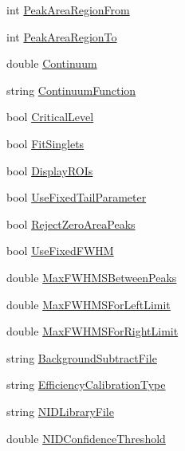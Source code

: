 \begin{DoxyCompactItemize}
\item 
int \hyperlink{class_scintilab_1_1_job_params_af2d6aea23fbd17166ef2699b07cc1197}{Peak\+Area\+Region\+From}
\item 
int \hyperlink{class_scintilab_1_1_job_params_a6e41425ec29431a5d1eaaace63b12582}{Peak\+Area\+Region\+To}
\item 
double \hyperlink{class_scintilab_1_1_job_params_ab3354168d42a8f5c23e465efa4c9bde5}{Continuum}
\item 
string \hyperlink{class_scintilab_1_1_job_params_a6560dfa91d1c2aee8308604a8d932ee3}{Continuum\+Function}
\item 
bool \hyperlink{class_scintilab_1_1_job_params_ac831d3241123c1bf2230d1e4c19f4c79}{Critical\+Level}
\item 
bool \hyperlink{class_scintilab_1_1_job_params_a771a3ff1807c3d1ce296e5a0f866b40b}{Fit\+Singlets}
\item 
bool \hyperlink{class_scintilab_1_1_job_params_a6db9db51477c56293619f73e0355d1da}{Display\+R\+O\+Is}
\item 
bool \hyperlink{class_scintilab_1_1_job_params_a6c217fb07858b573416969adccff67fe}{Use\+Fixed\+Tail\+Parameter}
\item 
bool \hyperlink{class_scintilab_1_1_job_params_aa6cf431fa112d6414c1d8ec0128a1272}{Reject\+Zero\+Area\+Peaks}
\item 
bool \hyperlink{class_scintilab_1_1_job_params_a8b87658f7291b548c701523311412220}{Use\+Fixed\+F\+W\+H\+M}
\item 
double \hyperlink{class_scintilab_1_1_job_params_a947ec9aa050ad8c2ac496071bfb18aa7}{Max\+F\+W\+H\+M\+S\+Between\+Peaks}
\item 
double \hyperlink{class_scintilab_1_1_job_params_adf3e9f8affd2eafb0372f78a22c0f96e}{Max\+F\+W\+H\+M\+S\+For\+Left\+Limit}
\item 
double \hyperlink{class_scintilab_1_1_job_params_a5d802288df6d97edde4ea8841a70d16b}{Max\+F\+W\+H\+M\+S\+For\+Right\+Limit}
\item 
string \hyperlink{class_scintilab_1_1_job_params_a2cc234f12fe0c4b2b9fceaabf038e1b6}{Background\+Subtract\+File}
\item 
string \hyperlink{class_scintilab_1_1_job_params_a45269d4387cc3e0a5bff447ae1e2d5e8}{Efficiency\+Calibration\+Type}
\item 
string \hyperlink{class_scintilab_1_1_job_params_a3b26558c0d462457fd091cd109ff2972}{N\+I\+D\+Library\+File}
\item 
double \hyperlink{class_scintilab_1_1_job_params_a498964727c90cd03050781cd8eb97e28}{N\+I\+D\+Confidence\+Threshold}

\end{DoxyCompactItemize}
